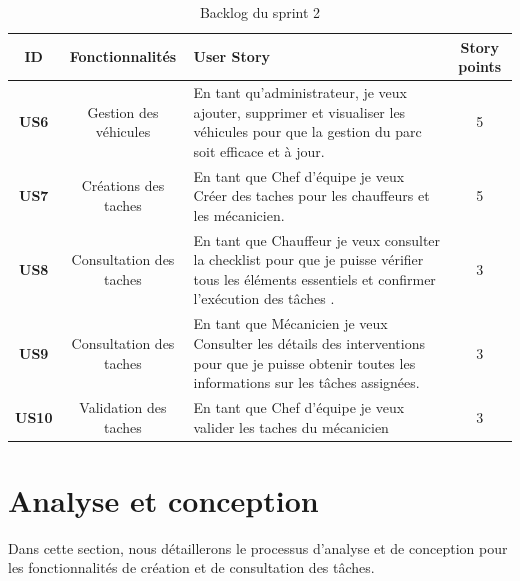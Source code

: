 \begin{table}[H]
  \centering
  \renewcommand{\arraystretch}{1} %
  \begin{tabular}{|c|c|p{7.8cm}|c|}
    \hline
    \textbf{ID}   & \textbf{Fonctionnalités} & \centering \textbf{User Story}                                                                                                                      & \textbf {Story points} \\
    \hline
    \textbf{US6}  & Gestion des véhicules    & En tant qu'administrateur, je veux ajouter, supprimer et visualiser les véhicules pour que la gestion du parc soit efficace et à jour.              & 5                      \\
    \hline
    \textbf{US7}  & Créations des taches     & En tant que Chef d'équipe je veux Créer des taches pour les chauffeurs et les mécanicien.                                                           & 5                      \\
    \hline
    \textbf{US8}  & Consultation des taches  & En tant que Chauffeur je veux consulter la checklist pour que je puisse vérifier tous les éléments essentiels et confirmer l'exécution des tâches . & 3                      \\
    \hline
    \textbf{US9}  & Consultation des taches  & En tant que Mécanicien je veux Consulter les détails des interventions pour que je puisse obtenir toutes les informations sur les tâches assignées. & 3                      \\
    \hline
    \textbf{US10} & Validation des taches    & En tant que Chef d'équipe je veux valider les taches du mécanicien                                                                                  & 3                      \\
    \hline
  \end{tabular}
  \caption{Backlog du sprint 2}

\end{table}

\newpage
\section{Analyse et conception}

Dans cette section, nous détaillerons le processus d'analyse et de conception pour les fonctionnalités de création et de consultation des tâches.

